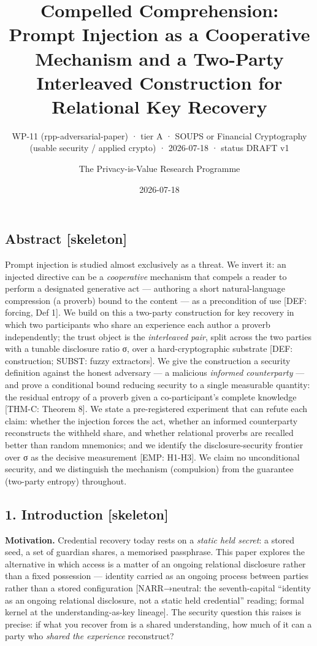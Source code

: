 \documentclass[
  11pt,
]{article}
\title{Compelled Comprehension: Prompt Injection as a Cooperative
Mechanism and a Two-Party Interleaved Construction for Relational Key
Recovery}
\subtitle{WP-11 (rpp-adversarial-paper) · tier A · SOUPS or Financial
Cryptography (usable security / applied crypto) · 2026-07-18 · status
DRAFT v1}
\author{The Privacy-is-Value Research Programme}
\date{2026-07-18}
\begin{document}
\maketitle

\subsection{Abstract {[}skeleton{]}}\label{abstract-skeleton}

Prompt injection is studied almost exclusively as a threat. We invert
it: an injected directive can be a \emph{cooperative} mechanism that
compels a reader to perform a designated generative act --- authoring a
short natural-language compression (a proverb) bound to the content ---
as a precondition of use {[}DEF: forcing, Def 1{]}. We build on this a
two-party construction for key recovery in which two participants who
share an experience each author a proverb independently; the trust
object is the \emph{interleaved pair}, split across the two parties with
a tunable disclosure ratio σ, over a hard-cryptographic substrate
{[}DEF: construction; SUBST: fuzzy extractors{]}. We give the
construction a security definition against the honest adversary --- a
malicious \emph{informed counterparty} --- and prove a conditional bound
reducing security to a single measurable quantity: the residual entropy
of a proverb given a co-participant's complete knowledge {[}THM-C:
Theorem 8{]}. We state a pre-registered experiment that can refute each
claim: whether the injection forces the act, whether an informed
counterparty reconstructs the withheld share, and whether relational
proverbs are recalled better than random mnemonics; and we identify the
disclosure-security frontier over σ as the decisive measurement {[}EMP:
H1-H3{]}. We claim no unconditional security, and we distinguish the
mechanism (compulsion) from the guarantee (two-party entropy)
throughout.

\subsection{1. Introduction {[}skeleton{]}}\label{introduction-skeleton}

\textbf{Motivation.} Credential recovery today rests on a \emph{static
held secret}: a stored seed, a set of guardian shares, a memorised
passphrase. This paper explores the alternative in which access is a
matter of an ongoing relational disclosure rather than a fixed
possession --- identity carried as an ongoing process between parties
rather than a stored configuration {[}NARR→neutral: the seventh-capital
``identity as an ongoing relational disclosure, not a static held
credential'' reading; formal kernel at the understanding-as-key
lineage{]}. The security question this raises is precise: if what you
recover from is a shared understanding, how much of it can a party who
\emph{shared the experience} reconstruct?
\end{document}
